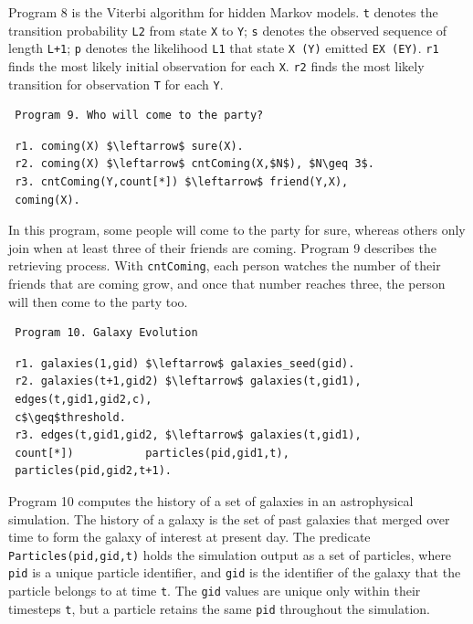 \begin{appendix}
 Program 8 \cite{7113340} is the Viterbi algorithm for hidden Markov models. \texttt{t} denotes the transition probability \texttt{L2} from state \texttt{X} to \texttt{Y}; \texttt{s} denotes the observed sequence of length \texttt{L+1}; \texttt{p} denotes the likelihood \texttt{L1} that state \texttt{X (Y)} emitted \texttt{EX (EY)}. \texttt{r1} finds the most likely initial observation for each \texttt{X}. \texttt{r2} finds the most likely transition for observation \texttt{T} for each \texttt{Y}.
 
 \begin{verbatim}
 Program 9. Who will come to the party?
 \end{verbatim}\small
 \begin{lstlisting}
 r1. coming(X) $\leftarrow$ sure(X).
 r2. coming(X) $\leftarrow$ cntComing(X,$N$), $N\geq 3$.
 r3. cntComing(Y,count[*]) $\leftarrow$ friend(Y,X),
 coming(X).
 \end{lstlisting}
 \normalsize
 
 In this program, some people will come to the party for sure, whereas others only join when at least three of their friends are coming. Program 9 \cite{7113340} describes the retrieving process. With \texttt{cntComing}, each person watches the number of their friends that are coming grow, and once that number reaches three, the person will then come to the party too.
 
 \begin{verbatim}
 Program 10. Galaxy Evolution
 \end{verbatim}\small
 \begin{lstlisting}
 r1. galaxies(1,gid) $\leftarrow$ galaxies_seed(gid).
 r2. galaxies(t+1,gid2) $\leftarrow$ galaxies(t,gid1),
 edges(t,gid1,gid2,c),
 c$\geq$threshold.
 r3. edges(t,gid1,gid2, $\leftarrow$ galaxies(t,gid1),
 count[*])           particles(pid,gid1,t),
 particles(pid,gid2,t+1).
 \end{lstlisting}
 \normalsize
 
 Program 10 \cite{Wang:2015:AFR:2824032.2824052} computes the history of a set of galaxies in an astrophysical simulation. The history of a galaxy is the set of past galaxies that merged over time to form the galaxy of interest at present day. The predicate \texttt{Particles(pid,gid,t)} holds the simulation output as a set of particles, where \texttt{pid} is a unique particle identifier, and \texttt{gid} is the identifier of the galaxy that the particle belongs to at time \texttt{t}. The \texttt{gid} values are unique only within their timesteps \texttt{t}, but a particle retains the same \texttt{pid} throughout the simulation.
 

\end{appendix}
